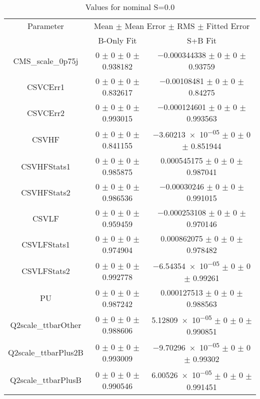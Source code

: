 \begin{table}
\centering
\caption{Values for nominal S=0.0}
\begin{tabular}{ccc}
\toprule
Parameter & \multicolumn{2}{c}{Mean $\pm$ Mean Error $\pm$ RMS $\pm$ Fitted Error}\\
 & B-Only Fit & S+B Fit\\
\midrule
CMS\_scale\_0p75j & \num{0} $\pm$ \num{0} $\pm$ \num{0} $\pm$ \num{0.938182} & \num{-0.000344338} $\pm$ \num{0} $\pm$ \num{0} $\pm$ \num{0.93759}\\
CSVCErr1 & \num{0} $\pm$ \num{0} $\pm$ \num{0} $\pm$ \num{0.832617} & \num{-0.00108481} $\pm$ \num{0} $\pm$ \num{0} $\pm$ \num{0.84275}\\
CSVCErr2 & \num{0} $\pm$ \num{0} $\pm$ \num{0} $\pm$ \num{0.993015} & \num{-0.000124601} $\pm$ \num{0} $\pm$ \num{0} $\pm$ \num{0.993563}\\
CSVHF & \num{0} $\pm$ \num{0} $\pm$ \num{0} $\pm$ \num{0.841155} & \num{-3.60213e-05} $\pm$ \num{0} $\pm$ \num{0} $\pm$ \num{0.851944}\\
CSVHFStats1 & \num{0} $\pm$ \num{0} $\pm$ \num{0} $\pm$ \num{0.985875} & \num{0.000545175} $\pm$ \num{0} $\pm$ \num{0} $\pm$ \num{0.987041}\\
CSVHFStats2 & \num{0} $\pm$ \num{0} $\pm$ \num{0} $\pm$ \num{0.986536} & \num{-0.00030246} $\pm$ \num{0} $\pm$ \num{0} $\pm$ \num{0.991015}\\
CSVLF & \num{0} $\pm$ \num{0} $\pm$ \num{0} $\pm$ \num{0.959459} & \num{-0.000253108} $\pm$ \num{0} $\pm$ \num{0} $\pm$ \num{0.970146}\\
CSVLFStats1 & \num{0} $\pm$ \num{0} $\pm$ \num{0} $\pm$ \num{0.974904} & \num{0.000862075} $\pm$ \num{0} $\pm$ \num{0} $\pm$ \num{0.978482}\\
CSVLFStats2 & \num{0} $\pm$ \num{0} $\pm$ \num{0} $\pm$ \num{0.992778} & \num{-6.54354e-05} $\pm$ \num{0} $\pm$ \num{0} $\pm$ \num{0.99261}\\
PU & \num{0} $\pm$ \num{0} $\pm$ \num{0} $\pm$ \num{0.987242} & \num{0.000127513} $\pm$ \num{0} $\pm$ \num{0} $\pm$ \num{0.988563}\\
Q2scale\_ttbarOther & \num{0} $\pm$ \num{0} $\pm$ \num{0} $\pm$ \num{0.988606} & \num{5.12809e-05} $\pm$ \num{0} $\pm$ \num{0} $\pm$ \num{0.990851}\\
Q2scale\_ttbarPlus2B & \num{0} $\pm$ \num{0} $\pm$ \num{0} $\pm$ \num{0.993009} & \num{-9.70296e-05} $\pm$ \num{0} $\pm$ \num{0} $\pm$ \num{0.99302}\\
Q2scale\_ttbarPlusB & \num{0} $\pm$ \num{0} $\pm$ \num{0} $\pm$ \num{0.990546} & \num{6.00526e-05} $\pm$ \num{0} $\pm$ \num{0} $\pm$ \num{0.991451}\\

\end{tabular}
\end{table}
